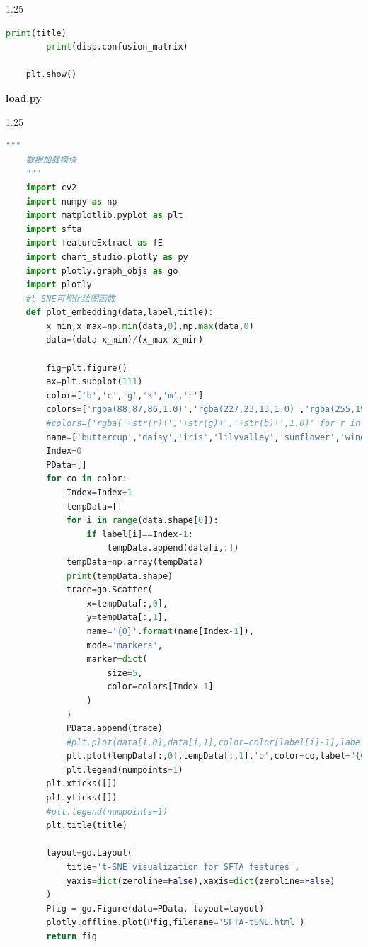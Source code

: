 \documentclass[supercite]{HustGraduPaper}
\begin{document}
\begin{sloppypar}
\begin{appendices}
\begin{spacing}{1.25}
\begin{lstlisting}[language=python]
        print(title)
        print(disp.confusion_matrix)
    
    plt.show()
  \end{lstlisting}
\end{spacing}
\textbf{load.py}
  \begin{spacing}{1.25}
  \begin{lstlisting}[language=python]
    """
    数据加载模块
    """
    import cv2
    import numpy as np
    import matplotlib.pyplot as plt
    import sfta
    import featureExtract as fE
    import chart_studio.plotly as py
    import plotly.graph_objs as go
    import plotly
    #t-SNE可视化绘图函数
    def plot_embedding(data,label,title):
        x_min,x_max=np.min(data,0),np.max(data,0)
        data=(data-x_min)/(x_max-x_min)
    
        fig=plt.figure()
        ax=plt.subplot(111)
        color=['b','c','g','k','m','r']
        colors=['rgba(88,87,86,1.0)','rgba(227,23,13,1.0)','rgba(255,192,203,1.0)','rgba(3,168,158,1.0)','rgba(227,207,87,1.0)','rgba(138,43,226,1.0)']
        #colors=['rgba('+str(r)+','+str(g)+','+str(b)+',1.0)' for r in np.linspace(25,168,6) for g in np.linspace(40,80,6) for b in np.linspace(0,255,6)]
        name=['buttercup','daisy','iris','lilyvalley','sunflower','windflower']
        Index=0
        PData=[]
        for co in color:
            Index=Index+1
            tempData=[]
            for i in range(data.shape[0]):
                if label[i]==Index-1:
                    tempData.append(data[i,:])
            tempData=np.array(tempData)
            print(tempData.shape)
            trace=go.Scatter(
                x=tempData[:,0],
                y=tempData[:,1],
                name='{0}'.format(name[Index-1]),
                mode='markers',
                marker=dict(
                    size=5,
                    color=colors[Index-1]
                )
            )
            PData.append(trace)
            #plt.plot(data[i,0],data[i,1],color=color[label[i]-1],label="{0}".format(name[label[i]-1]))
            plt.plot(tempData[:,0],tempData[:,1],'o',color=co,label="{0}".format(name[Index-1]))
            plt.legend(numpoints=1)
        plt.xticks([])
        plt.yticks([])
        #plt.legend(numpoints=1)
        plt.title(title)
    
        layout=go.Layout(
            title='t-SNE visualization for SFTA features',
            yaxis=dict(zeroline=False),xaxis=dict(zeroline=False)
        )
        Pfig = go.Figure(data=PData, layout=layout)
        plotly.offline.plot(Pfig,filename='SFTA-tSNE.html')
        return fig
    

\end{lstlisting}
\end{spacing}
\end{appendices}
\end{sloppypar}
\end{document}
